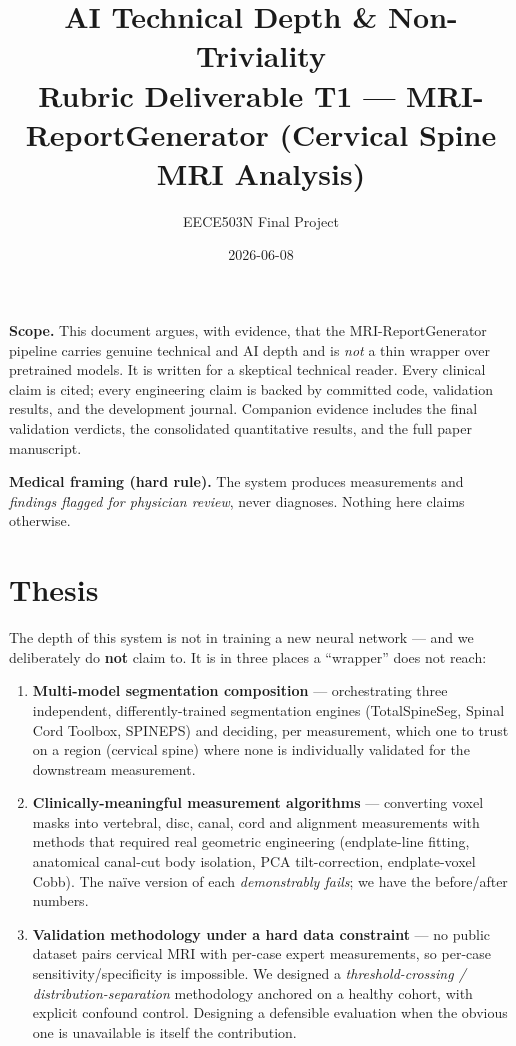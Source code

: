 \documentclass[11pt]{article}
\title{\textbf{AI Technical Depth \& Non-Triviality}\\[2pt]
\large Rubric Deliverable T1 --- MRI-ReportGenerator (Cervical Spine MRI Analysis)}
\author{EECE503N Final Project}
\date{2026-06-08}
\begin{document}
\maketitle

\noindent\textbf{Scope.} This document argues, with evidence, that the MRI-ReportGenerator pipeline
carries genuine technical and AI depth and is \emph{not} a thin wrapper over pretrained models. It is
written for a skeptical technical reader. Every clinical claim is cited; every engineering claim is
backed by committed code, validation results, and the development journal. Companion evidence includes
the final validation verdicts, the consolidated quantitative results, and the full paper manuscript.

\medskip
\noindent\textbf{Medical framing (hard rule).} The system produces measurements and \emph{findings
flagged for physician review}, never diagnoses. Nothing here claims otherwise.

\section{Thesis}
The depth of this system is not in training a new neural network --- and we deliberately do \textbf{not}
claim to. It is in three places a ``wrapper'' does not reach:

\begin{enumerate}
  \item \textbf{Multi-model segmentation composition} --- orchestrating three independent,
  differently-trained segmentation engines (TotalSpineSeg, Spinal Cord Toolbox, SPINEPS) and deciding,
  per measurement, which one to trust on a region (cervical spine) where none is individually validated
  for the downstream measurement.
  \item \textbf{Clinically-meaningful measurement algorithms} --- converting voxel masks into vertebral,
  disc, canal, cord and alignment measurements with methods that required real geometric engineering
  (endplate-line fitting, anatomical canal-cut body isolation, PCA tilt-correction, endplate-voxel
  Cobb). The na\"ive version of each \emph{demonstrably fails}; we have the before/after numbers.
  \item \textbf{Validation methodology under a hard data constraint} --- no public dataset pairs
  cervical MRI with per-case expert measurements, so per-case sensitivity/specificity is impossible. We
  designed a \emph{threshold-crossing / distribution-separation} methodology anchored on a healthy
  cohort, with explicit confound control. Designing a defensible evaluation when the obvious one is
  unavailable is itself the contribution.
\end{enumerate}
\end{document}
